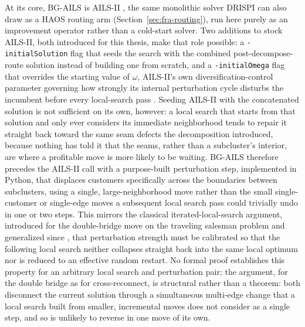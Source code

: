 At its core, BG-AILS is AILS-II \citep{maximoAILSIIAdaptiveIterated2024}, the same monolithic solver DRISPI can also draw as a HAOS routing arm (Section~\ref{sec:fra-routing}), run here purely as an improvement operator rather than a cold-start solver. Two additions to stock AILS-II, both introduced for this thesis, make that role possible: a \texttt{-initialSolution} flag that seeds the search with the combined post-decompose-route solution instead of building one from scratch, and a \texttt{-initialOmega} flag that overrides the starting value of $\omega$, AILS-II's own diversification-control parameter governing how strongly its internal perturbation cycle disturbs the incumbent before every local-search pass \citep{maximoHybridAdaptiveIterated2021}. Seeding AILS-II with the concatenated solution is not sufficient on its own, however: a local search that starts from that solution and only ever considers its immediate neighborhood tends to repair it straight back toward the same seam defects the decomposition introduced, because nothing has told it that the seams, rather than a subcluster's interior, are where a profitable move is more likely to be waiting. BG-AILS therefore precedes the AILS-II call with a purpose-built perturbation step, implemented in Python, that displaces customers specifically across the boundaries between subclusters, using a single, large-neighborhood move rather than the small single-customer or single-edge moves a subsequent local search pass could trivially undo in one or two steps. This mirrors the classical iterated-local-search argument, introduced for the double-bridge move on the traveling salesman problem \citep{martinLargestepMarkovChains1991} and generalized since \citep{lourencoIteratedLocalSearch2003}, that perturbation strength must be calibrated so that the following local search neither collapses straight back into the same local optimum nor is reduced to an effective random restart. No formal proof establishes this property for an arbitrary local search and perturbation pair; the argument, for the double bridge as for cross-reconnect, is structural rather than a theorem: both disconnect the current solution through a simultaneous multi-edge change that a local search built from smaller, incremental moves does not consider as a single step, and so is unlikely to reverse in one move of its own.

